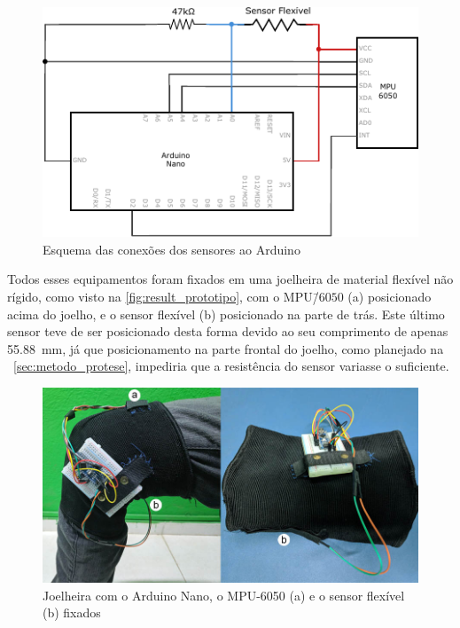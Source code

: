 \begin{figure}[ht]
	\caption{\label{fig:result_schem}Esquema das conexões dos sensores ao Arduino}
	\begin{center}
		\includegraphics[width=.8\textwidth]{resources/result_schem}
	\end{center}
\end{figure}

Todos esses equipamentos foram fixados em uma joelheira de material flexível não rígido, como visto na \autoref{fig:result_prototipo}, com o MPU\=/\(6050\) (a) posicionado acima do joelho, e o sensor flexível (b) posicionado na parte de trás. Este último sensor teve de ser posicionado desta forma devido ao seu comprimento de apenas \SI{55.88}{\milli\meter}, já que posicionamento na parte frontal do joelho, como planejado na ~\autoref{sec:metodo_protese}, impediria que a resistência do sensor variasse o suficiente.

\begin{figure}[ht]
	\caption{\label{fig:result_prototipo}Joelheira com o Arduino Nano, o MPU-6050 (a) e o sensor flexível (b) fixados}
	\begin{center}
		\includegraphics[width=.8\textwidth]{resources/result_prototipo}
	\end{center}
\end{figure}


